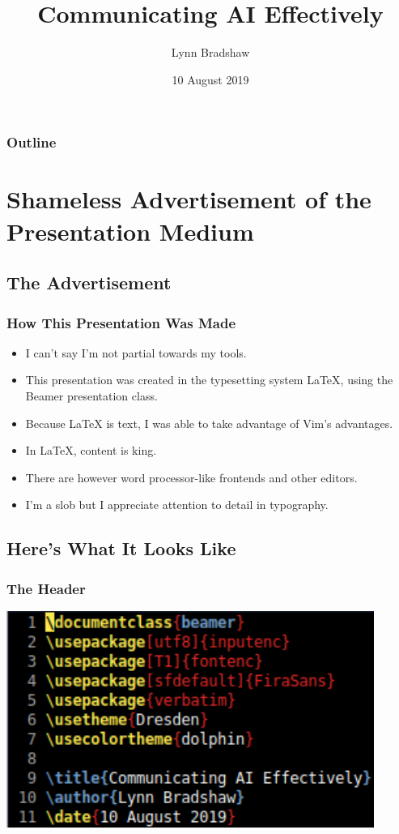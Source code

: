 \documentclass{beamer}
\title{Communicating AI Effectively}
\author{Lynn Bradshaw}
\date{10 August 2019}
\begin{document}
  \begin{frame}
    \maketitle
  \end{frame}

  \begin{frame}
    \frametitle{Outline}
    \tableofcontents[pausesections]
  \end{frame}

  \section{Shameless Advertisement of the Presentation Medium}

  \subsection{The Advertisement}

  \begin{frame}
    \frametitle{How This Presentation Was Made}
    \begin{itemize}
      \item I can't say I'm not partial towards my tools.
      \pause
      \item This presentation was created in the typesetting system \LaTeX,
        using the Beamer presentation class.
      \pause
      \item Because \LaTeX{} is text, I was able to take advantage of Vim's
        advantages.
      \pause
      \item In \LaTeX, content is king.
      \item There are however word processor-like frontends and other editors.
      \pause
      \item I'm a slob but I appreciate attention to detail in typography.
    \end{itemize}
  \end{frame}

  \subsection{Here's What It Looks Like}

  \begin{frame}
    \frametitle{The Header}
    \begin{center}
      \includegraphics[width=0.9\textwidth]{latex-header.png}
    \end{center}
  \end{frame}
\end{document}
